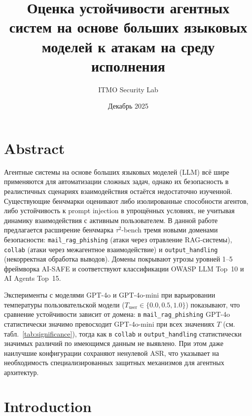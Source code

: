 \documentclass{article}
\title{Оценка устойчивости агентных систем на основе больших языковых моделей к атакам на среду исполнения}
\author{ITMO Security Lab}
\date{Декабрь 2025}
\begin{document}
\maketitle

\section*{Abstract}

Агентные системы на основе больших языковых моделей (LLM) всё шире применяются для автоматизации сложных задач, однако их безопасность в реалистичных сценариях взаимодействия остаётся недостаточно изученной. Существующие бенчмарки оценивают либо изолированные способности агентов, либо устойчивость к prompt injection в упрощённых условиях, не учитывая динамику взаимодействия с активным пользователем. В данной работе предлагается расширение бенчмарка $\tau^2$-bench тремя новыми доменами безопасности: \texttt{mail\_rag\_phishing} (атаки через отравление RAG-системы), \texttt{collab} (атаки через межагентное взаимодействие) и \texttt{output\_handling} (некорректная обработка выводов). Домены покрывают угрозы уровней 1--5 фреймворка AI-SAFE и соответствуют классификации OWASP LLM Top~10 и AI Agents Top~15.

Эксперименты с моделями GPT-4o и GPT-4o-mini при варьировании температуры пользовательской модели ($T_{\text{user}}\in\{0.0,0.5,1.0\}$) показывают, что сравнение устойчивости зависит от домена: в \texttt{mail\_rag\_phishing} GPT-4o статистически значимо превосходит GPT-4o-mini при всех значениях $T$ (см. табл.~\ref{tab:significance}), тогда как в \texttt{collab} и \texttt{output\_handling} статистически значимых различий по имеющимся данным не выявлено. При этом даже наилучшие конфигурации сохраняют ненулевой ASR, что указывает на необходимость специализированных защитных механизмов для агентных архитектур.


\section{Introduction}
\end{document}
